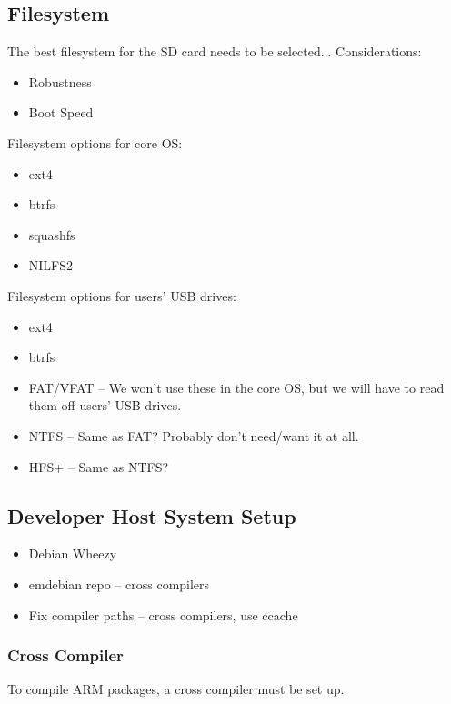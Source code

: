\subsection{Filesystem}
The best filesystem for the SD card needs to be selected... Considerations:

\begin{itemize}
  \item{Robustness}
  \item{Boot Speed}
\end{itemize}

Filesystem options for core OS:

\begin{itemize}
  \item{ext4}
  \item{btrfs}
  \item{squashfs}
  \item{NILFS2}
\end{itemize}

Filesystem options for users' USB drives:

\begin{itemize}
  \item{ext4}
  \item{btrfs}
  \item{FAT/VFAT} -- We won't use these in the core OS, but we will have to
  read them off users' USB drives.
  \item{NTFS} -- Same as FAT? Probably don't need/want it at all.
  \item{HFS+} -- Same as NTFS?
\end{itemize}


\subsection{Developer Host System Setup}

\begin{itemize}
  \item{Debian Wheezy}
  \item{emdebian repo} -- cross compilers
  \item{Fix compiler paths} -- cross compilers, use ccache
\end{itemize}

\subsubsection{Cross Compiler}
To compile ARM packages, a cross compiler must be set up.

